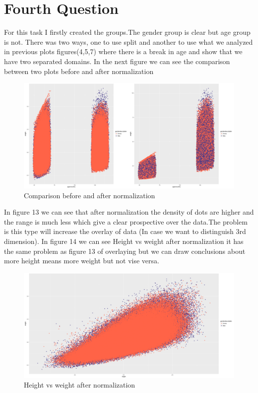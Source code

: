 \documentclass{article}
\begin{document}
	\section*{Fourth Question}
	For this task I firstly created the groups.The gender group is clear but age group is not. There was two ways, one to use split and another to use what we analyzed in previous plots figures(4,5,7) where there is a break in age and show that we have two separated domains.
	In the next figure we can see the comparison between two plots before and after normalization 
\begin{figure}[H]
	\begin{center}
		\includegraphics[scale=0.3]{normalizedageweightcomparsion.png}
	\end{center}
	\caption{Comparison before and after normalization}
\end{figure}
In figure 13 we can see that after normalization the density of dots are higher and the range is much less which give a clear prospective over the data.The problem is this type will increase the overlay of data (In case we want to distinguish 3rd dimension).
In figure 14 we can see Height vs weight after normalization it has the same problem as figure 13 of overlaying but we can draw conclusions about more height means more weight but not vise versa.
\begin{figure}[H]
	\begin{center}
		\includegraphics[scale=0.3]{heightweightnormalized.png}
	\end{center}
	\caption{Height vs weight after normalization}
\end{figure}
\end{document}
